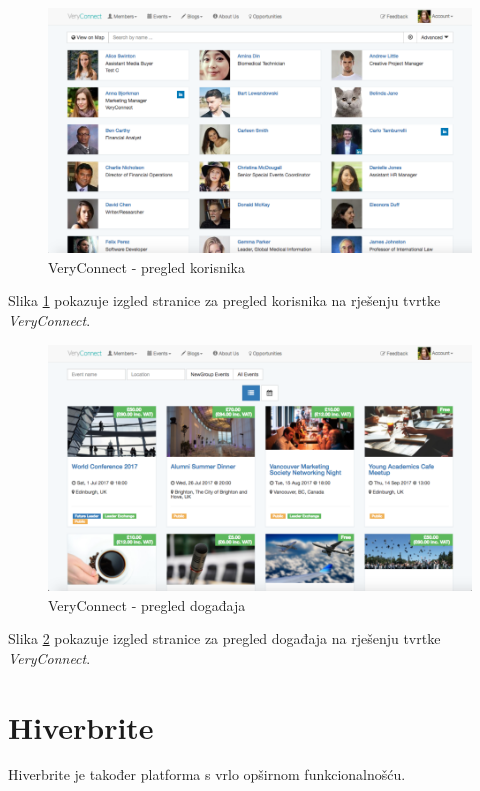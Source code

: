 \documentclass[zavrsni, numeric]{fer}
\begin{document}
\begin{figure}[H]
	\centering
	\includegraphics[width=13cm]{slike/very-connect-korisnici.png}
	\caption{VeryConnect - pregled korisnika}
	\label{fig:veryconn-users}
\end{figure}

Slika \ref{fig:veryconn-users} pokazuje izgled stranice za pregled korisnika na rješenju tvrtke \textit{VeryConnect}.

\begin{figure}[H]
	\centering
	\includegraphics[width=13cm]{slike/very-connect-dogadaji.png}
	\caption{VeryConnect - pregled događaja}
	\label{fig:veryconn-events}
\end{figure}

Slika \ref{fig:veryconn-events} pokazuje izgled stranice za pregled događaja na rješenju tvrtke \textit{VeryConnect}.

\section{Hiverbrite}
Hiverbrite je također platforma s vrlo opširnom funkcionalnošću.
\end{document}
